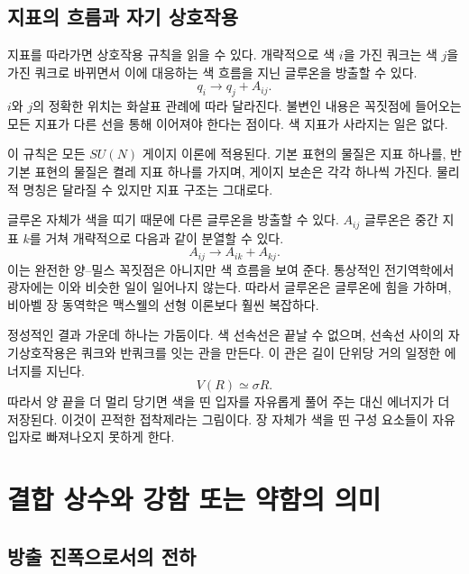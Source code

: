 \subsection{지표의 흐름과 자기 상호작용}

지표를 따라가면 상호작용 규칙을 읽을 수 있다. 개략적으로 색 \(i\)을 가진 쿼크는 색 \(j\)을 가진 쿼크로 바뀌면서 이에 대응하는 색 흐름을 지닌 글루온을 방출할 수 있다.
\begin{equation}
q_i\longrightarrow q_j+A_{ij}.
\label{eq:l5-quark-gluon-vertex}
\end{equation} \(i\)와 \(j\)의 정확한 위치는 화살표 관례에 따라 달라진다. 불변인 내용은 꼭짓점에 들어오는 모든 지표가 다른 선을 통해 이어져야 한다는 점이다. 색 지표가 사라지는 일은 없다.

이 규칙은 모든 \(SU(N)\) 게이지 이론에 적용된다. 기본 표현의 물질은 지표 하나를, 반기본 표현의 물질은 켤레 지표 하나를 가지며, 게이지 보손은 각각 하나씩 가진다. 물리적 명칭은 달라질 수 있지만 지표 구조는 그대로다.

글루온 자체가 색을 띠기 때문에 다른 글루온을 방출할 수 있다. \(A_{ij}\) 글루온은 중간 지표 \(k\)를 거쳐 개략적으로 다음과 같이 분열할 수 있다.
\begin{equation}
A_{ij}\longrightarrow A_{ik}+A_{kj}.
\label{eq:l5-three-gluon-index}
\end{equation} 이는 완전한 양--밀스 꼭짓점은 아니지만 색 흐름을 보여 준다. 통상적인 전기역학에서 광자에는 이와 비슷한 일이 일어나지 않는다. 따라서 글루온은 글루온에 힘을 가하며, 비아벨 장 동역학은 맥스웰의 선형 이론보다 훨씬 복잡하다.

정성적인 결과 가운데 하나는 가둠이다. 색 선속선은 끝날 수 없으며, 선속선 사이의 자기상호작용은 쿼크와 반쿼크를 잇는 관을 만든다. 이 관은 길이 단위당 거의 일정한 에너지를 지닌다.
\begin{equation}
V(R)\simeq \sigma R.
\end{equation} 따라서 양 끝을 더 멀리 당기면 색을 띤 입자를 자유롭게 풀어 주는 대신 에너지가 더 저장된다. 이것이 끈적한 접착제라는 그림이다. 장 자체가 색을 띤 구성 요소들이 자유 입자로 빠져나오지 못하게 한다.

\section{결합 상수와 강함 또는 약함의 의미}

\subsection{방출 진폭으로서의 전하}

